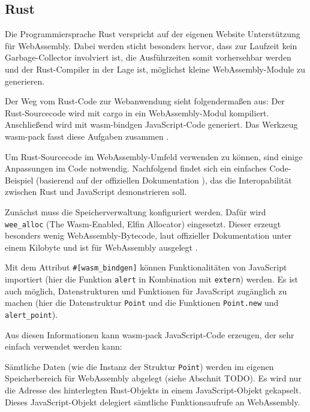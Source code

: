 

\subsection{Rust}

Die Programmiersprache Rust verspricht auf der eigenen Website \cite{RustWasmWebsite} Unterstützung für WebAssembly. Dabei werden sticht besonders hervor, dass zur Laufzeit kein Garbage-Collector involviert ist, die Ausführzeiten somit vorhersehbar werden und der Rust-Compiler in der Lage ist, möglichst kleine WebAssembly-Module zu generieren.

Der Weg vom Rust-Code zur Webanwendung sieht folgendermaßen aus: Der Rust-Sourcecode wird mit cargo in ein WebAssembly-Modul kompiliert. Anschließend wird mit wasm-bindgen JavaScript-Code generiert. Das Werkzeug wasm-pack fasst diese Aufgaben zusammen \cite{RustWasmBook}.

Um Rust-Sourcecode im WebAssembly-Umfeld verwenden zu können, sind einige Anpassungen im Code notwendig. Nachfolgend findet sich ein einfaches Code-Beispiel (basierend auf der offiziellen Dokumentation \cite{RustWasmBook}), das die Interopabilität zwischen Rust und JavaScript demonstrieren soll.



Zunächst muss die Speicherverwaltung konfiguriert werden. Dafür wird \lstinline{wee_alloc} (The Wasm-Enabled, Elfin Allocator) eingesetzt. Dieser erzeugt besonders wenig WebAs\-sembly-Bytecode, laut offizieller Dokumentation unter einem Kilobyte und ist für WebAssembly ausgelegt \cite{WeeAlloc}.

Mit dem Attribut \lstinline{#[wasm_bindgen]} können Funktionalitäten von JavaScript importiert (hier die Funktion \lstinline{alert} in Kombination mit \lstinline{extern}) werden. Es ist auch möglich, Datenstrukturen und Funktionen für JavaScript zugänglich zu machen (hier die Datenstruktur \lstinline{Point} und die Funktionen \lstinline{Point.new} und \lstinline{alert_point}).

Aus diesen Informationen kann wasm-pack JavaScript-Code erzeugen, der sehr einfach verwendet werden kann:



Sämtliche Daten (wie die Instanz der Struktur \lstinline{Point}) werden im eigenen Speicherbereich für WebAssembly abgelegt (siehe Abschnit TODO). Es wird nur die Adresse des hinterlegten Rust-Objekts in einem JavaScript-Objekt gekapselt. Dieses JavaScript-Objekt delegiert sämtliche Funktionsaufrufe an WebAssembly.
